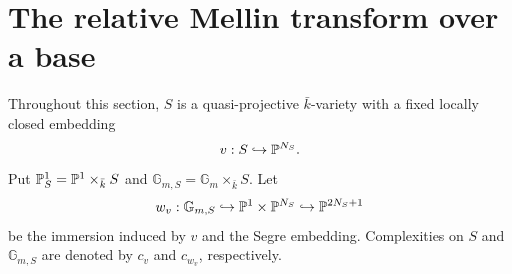 \documentclass[12pt,reqno]{amsart}
\theoremstyle{definition}
\theoremstyle{plain}
\theoremstyle{definition}
\theoremstyle{remark}
\newcommand{\bbG}{\mathbb{G}}  \newcommand{\bbH}{\mathbb{H}}
\newcommand{\Gm}{\bbG_m}
\begin{document}
\section{The relative Mellin transform over a base}
\label{sec:relative-mellin}

Throughout this section, \(S\) is a quasi-projective \(\bar k\)-variety with a fixed locally closed
embedding
\begin{equation}
\label{eq:relative-base-embedding}
        v:S\hookrightarrow\mathbb{P}^{N_S}.
\end{equation}
Put \(\mathbb{P}^1_S=\mathbb{P}^1\times_{\bar k}S\) and
\(\bbG_{m,S}=\Gm\times_{\bar k}S\).  Let
\[
        w_v:\bbG_{m,S}\hookrightarrow\bbP^1\times\bbP^{N_S}\hookrightarrow\bbP^{2N_S+1}
\]
be the immersion induced by \(v\) and the Segre embedding.  Complexities on \(S\) and \(\bbG_{m,S}\)
are denoted by \(c_v\) and \(c_{w_v}\), respectively.
\end{document}
